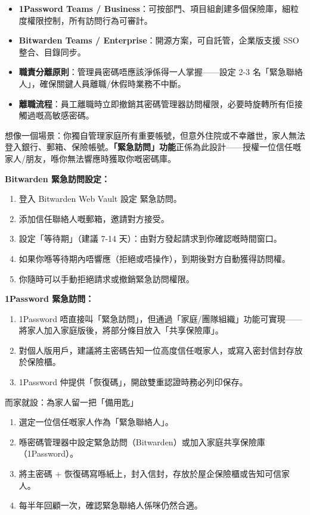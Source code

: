 \begin{itemize}
  \item \textbf{1Password Teams / Business}：可按部門、項目組創建多個保險庫，細粒度權限控制，所有訪問行為可審計。
  \item \textbf{Bitwarden Teams / Enterprise}：開源方案，可自託管，企業版支援 SSO 整合、目錄同步。
  \item \textbf{職責分離原則}：管理員密碼唔應該淨係得一人掌握——設定 2-3 名「緊急聯絡人」，確保關鍵人員離職/休假時業務不中斷。
  \item \textbf{離職流程}：員工離職時立即撤銷其密碼管理器訪問權限，必要時旋轉所有佢接觸過嘅高敏感密碼。
\end{itemize}


想像一個場景：你獨自管理家庭所有重要帳號，但意外住院或不幸離世，家人無法登入銀行、郵箱、保險帳號。\textbf{「緊急訪問」功能}正係為此設計——授權一位信任嘅家人/朋友，喺你無法響應時獲取你嘅密碼庫。

\textbf{Bitwarden 緊急訪問設定：}

\begin{enumerate}
  \item 登入 Bitwarden Web Vault 設定 緊急訪問。
  \item 添加信任聯絡人嘅郵箱，邀請對方接受。
  \item 設定「等待期」（建議 7-14 天）：由對方發起請求到你確認嘅時間窗口。
  \item 如果你喺等待期內唔響應（拒絕或唔操作），到期後對方自動獲得訪問權。
  \item 你隨時可以手動拒絕請求或撤銷緊急訪問權限。
\end{enumerate}

\textbf{1Password 緊急訪問：}

\begin{enumerate}
  \item 1Password 唔直接叫「緊急訪問」，但通過「家庭/團隊組織」功能可實現——將家人加入家庭版後，將部分條目放入「共享保險庫」。
  \item 對個人版用戶，建議將主密碼告知一位高度信任嘅家人，或寫入密封信封存放於保險櫃。
  \item 1Password 仲提供「恢復碼」，開啟雙重認證時務必列印保存。
\end{enumerate}

\begin{tcbpractice}{而家就設：為家人留一把「備用匙」}
\begin{enumerate}
  \item 選定一位信任嘅家人作為「緊急聯絡人」。
  \item 喺密碼管理器中設定緊急訪問（Bitwarden）或加入家庭共享保險庫（1Password）。
  \item 將主密碼 + 恢復碼寫喺紙上，封入信封，存放於屋企保險櫃或告知可信家人。
  \item 每半年回顧一次，確認緊急聯絡人係咪仍然合適。
\end{enumerate}

\end{tcbpractice}

